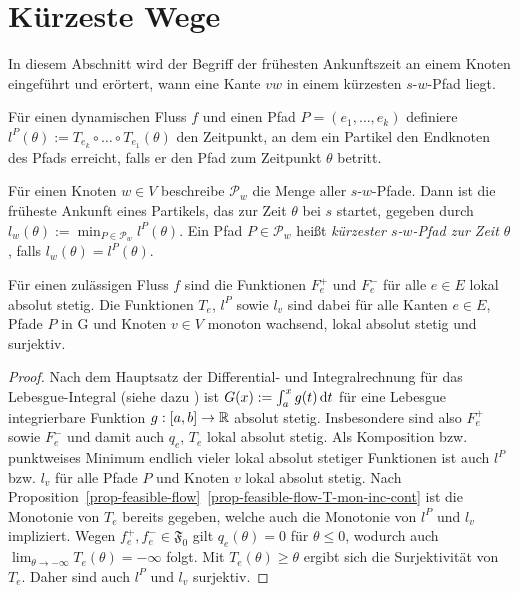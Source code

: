 \section{Kürzeste Wege}\label{sec-travel-times}

In diesem Abschnitt wird der Begriff der frühesten Ankunftszeit an einem Knoten eingeführt und erörtert, wann eine Kante $vw$ in einem kürzesten $s$-$w$-Pfad liegt.

\begin{definition}
	Für einen dynamischen Fluss $f$ und einen Pfad $P=(e_1,\dots,e_k)$ definiere $l^P(\theta):=T_{e_k}\circ\dots\circ T_{e_1}(\theta)$ den Zeitpunkt, an dem ein Partikel den Endknoten des Pfads erreicht, falls er den Pfad zum Zeitpunkt $\theta$ betritt.
	
	Für einen Knoten $w\in V$ beschreibe $\mathcal{P}_w$ die Menge aller $s$-$w$-Pfade.
	Dann ist die früheste Ankunft eines Partikels, das zur Zeit $\theta$ bei $s$ startet, gegeben durch $l_w(\theta):=\min_{P\in\mathcal{P}_w}l^P(\theta)$.
	Ein Pfad $P\in \mathcal{P}_w$ heißt \emph{kürzester $s$-$w$-Pfad zur Zeit $\theta$}, falls $l_w(\theta)=l^P(\theta)$.
\end{definition}

\begin{proposition}\label{prop-abs-cont-sur}
	Für einen zulässigen Fluss $f$ sind die Funktionen $F_e^+$ und $F_e^-$ für alle $e\in E$ lokal absolut stetig.
	Die Funktionen $T_e$, $l^P$ sowie $l_v$ sind dabei für alle Kanten $e\in E$, Pfade $P$ in G und Knoten $v\in V$ monoton wachsend, lokal absolut stetig und surjektiv.
\end{proposition}
\begin{proof}
	Nach dem Hauptsatz der Differential- und Integralrechnung für das Lebesgue-Integral (siehe dazu \cite[Satz 4.14]{Elstrodt2011Abs}) ist $G(x):= \int_a^x g(t) \mathop{}\!\mathrm{d} t$ für eine Lebesgue integrierbare Funktion $g: [a,b] \to \mathbb{R}$ absolut stetig.
	Insbesondere sind also $F_e^+$ sowie $F_e^-$ und damit auch $q_e$, $T_e$ lokal absolut stetig.
	Als Komposition bzw. punktweises Minimum endlich vieler lokal absolut stetiger Funktionen ist auch $l^P$ bzw. $l_v$ für alle Pfade $P$ und Knoten $v$ lokal absolut stetig.
	Nach Proposition~\ref{prop-feasible-flow}~\ref{prop-feasible-flow-T-mon-inc-cont} ist die Monotonie von $T_e$ bereits gegeben, welche auch die Monotonie von $l^P$ und $l_v$ impliziert.
	Wegen $f_e^+, f_e^-\in\mathfrak{F_0}$ gilt $q_e(\theta)=0$ für $\theta\leq 0$, wodurch auch $\lim_{\theta\to-\infty} T_e(\theta) = - \infty$ folgt.
	Mit $T_e(\theta)\geq \theta$ ergibt sich die Surjektivität von $T_e$.
	Daher sind auch $l^P$ und $l_v$ surjektiv.
\end{proof}


